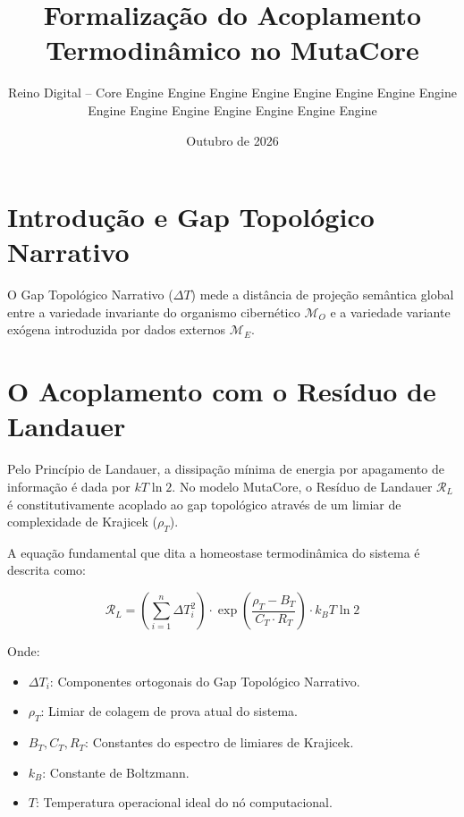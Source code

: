 \documentclass{article}
\title{Formalização do Acoplamento Termodinâmico no MutaCore}
\author{Reino Digital -- Core Engine Engine Engine Engine Engine Engine Engine Engine Engine Engine Engine Engine Engine Engine Engine}
\date{Outubro de 2026}
\begin{document}
\maketitle

\section{Introdução e Gap Topológico Narrativo}
O Gap Topológico Narrativo ($\Delta T$) mede a distância de projeção semântica global entre a variedade invariante do organismo cibernético $\mathcal{M}_O$ e a variedade variante exógena introduzida por dados externos $\mathcal{M}_E$.

\section{O Acoplamento com o Resíduo de Landauer}
Pelo Princípio de Landauer, a dissipação mínima de energia por apagamento de informação é dada por $kT \ln 2$. No modelo MutaCore, o Resíduo de Landauer $\mathcal{R}_L$ é constitutivamente acoplado ao gap topológico através de um limiar de complexidade de Krajicek ($\rho_T$).

A equação fundamental que dita a homeostase termodinâmica do sistema é descrita como:

\begin{equation}
\mathcal{R}_L = \left( \sum_{i=1}^{n} \Delta T_i^2 \right) \cdot \exp\left( \frac{\rho_T - B_T}{C_T \cdot R_T} \right) \cdot k_B T \ln 2
\end{equation}

Onde:
\begin{itemize}
    \item $\Delta T_i$: Componentes ortogonais do Gap Topológico Narrativo.
    \item $\rho_T$: Limiar de colagem de prova atual do sistema.
    \item $B_T, C_T, R_T$: Constantes do espectro de limiares de Krajicek.
    \item $k_B$: Constante de Boltzmann.
    \item $T$: Temperatura operacional ideal do nó computacional.
\end{itemize}
\end{document}
